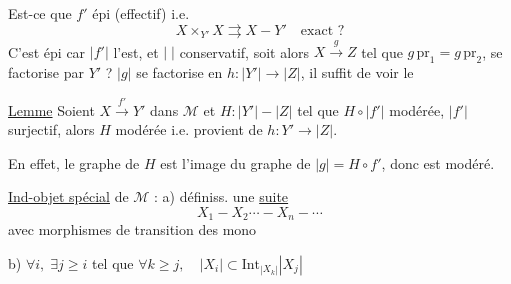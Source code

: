 Est-ce que $f'$ épi (effectif) i.e.
\[
X\times_{Y'}X\rightrightarrows X-Y'\quad\text{exact ?}
\]
C'est épi car $|f'|$ l'est, et $|\;|$ conservatif,
soit alors $X\xrightarrow{g}Z$ tel que $g\,\mathrm{pr}_1=g\,\mathrm{pr}_2$, se factorise par $Y'$ ?
 $|g|$ se factorise en $h:|Y'|\to|Z|$, il suffit de voir le

\uline{Lemme} Soient $X\xrightarrow{f'}Y'$ dans $\mathcal M$ et $H:|Y'|-|Z|$ tel que $H\circ|f'|$ modérée,  $|f'|$ surjectif, alors $H$ modérée i.e. provient de $h:Y'\longrightarrow|Z|$.

En effet,  le graphe de $H$ est l'image du graphe de $|g|=H\circ f'$, donc est modéré.


\uline{Ind-objet spécial}\inserted{$*$} de $\mathcal M$ : a) définiss.  une \uline{suite}
\[
X_1-X_2\cdots-X_n-\cdots
\]
avec morphismes de transition des mono

b) $\forall i,\;\exists j\geq i$ tel que $\forall k\geq j,\quad |X_i|\subset\mathrm{Int}_{|X_k|}|X_j|$

